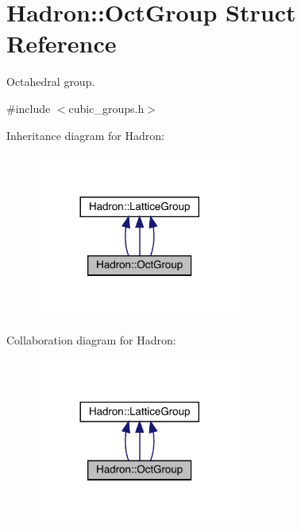 \hypertarget{structHadron_1_1OctGroup}{}\section{Hadron\+:\+:Oct\+Group Struct Reference}
\label{structHadron_1_1OctGroup}


Octahedral group.  




{\ttfamily \#include $<$cubic\+\_\+groups.\+h$>$}



Inheritance diagram for Hadron\+:
\nopagebreak
\begin{figure}[H]
\begin{center}
\leavevmode
\includegraphics[width=192pt]{da/da9/structHadron_1_1OctGroup__inherit__graph}
\end{center}
\end{figure}


Collaboration diagram for Hadron\+:
\nopagebreak
\begin{figure}[H]
\begin{center}
\leavevmode
\includegraphics[width=192pt]{df/d0d/structHadron_1_1OctGroup__coll__graph}
\end{center}
\end{figure}
